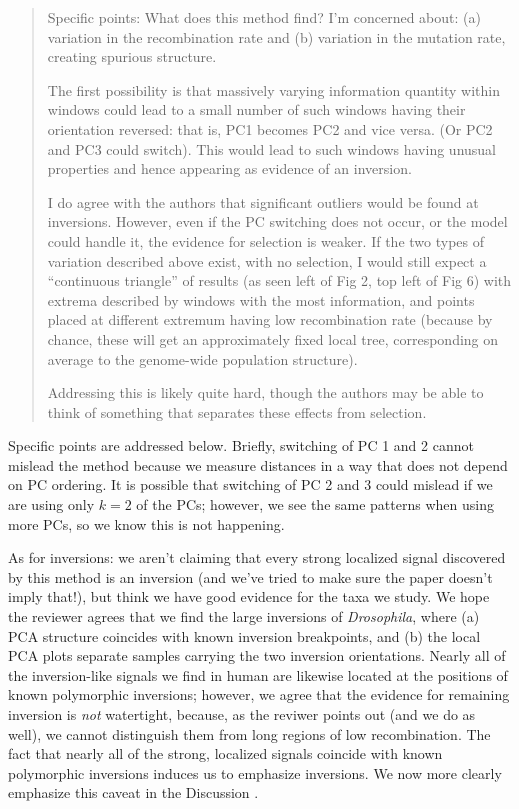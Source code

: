 \begin{quote}
    Specific points: What does this method find? I'm concerned about:
    (a) variation in the recombination rate
    and (b) variation in the mutation rate, creating spurious structure.

    The first possibility is that massively varying information quantity
    within windows could lead to a small number of such windows having their
    orientation reversed: that is, PC1 becomes PC2 and vice versa. (Or PC2 and PC3
    could switch). This would lead to such windows having unusual properties and
    hence appearing as evidence of an inversion.

    I do agree with the authors that significant outliers would be found at
    inversions. However, even if the PC switching does not occur, or the model could
    handle it, the evidence for selection is weaker.  If the two types of variation
    described above exist, with no selection, I would still expect a ``continuous
    triangle'' of results (as seen left of Fig 2, top left of Fig 6) with extrema
    described by windows with the most information, and points placed at different
    extremum having low recombination rate (because by chance, these will get an
    approximately fixed local tree, corresponding on average to the genome-wide
    population structure).

    Addressing this is likely quite hard, though the authors may be able to think of
    something that separates these effects from selection.
\end{quote}

Specific points are addressed below.
Briefly, switching of PC 1 and 2 cannot mislead the method
because we measure distances in a way that does not depend on PC ordering.
It is possible that switching of PC 2 and 3 could mislead if we are using only $k=2$ of the PCs;
however, we see the same patterns when using more PCs, so we know this is not happening.

As for inversions: we aren't claiming that every strong localized signal discovered by this method
is an inversion (and we've tried to make sure the paper doesn't imply that!),
but think we have good evidence for the taxa we study.
We hope the reviewer agrees that we find the large inversions of \emph{Drosophila},
where (a) PCA structure coincides with known inversion breakpoints, 
and (b) the local PCA plots separate samples carrying the two inversion orientations.
Nearly all of the inversion-like signals we find in human are likewise located at the positions 
of known polymorphic inversions; 
however, we agree that the evidence for remaining inversion is \emph{not} watertight,
because, as the reviwer points out (and we do as well),
we cannot distinguish them from long regions of low recombination.
The fact that nearly all of the strong, localized signals coincide with known polymorphic inversions
induces us to emphasize inversions.
We now more clearly emphasize this caveat in the Discussion .

